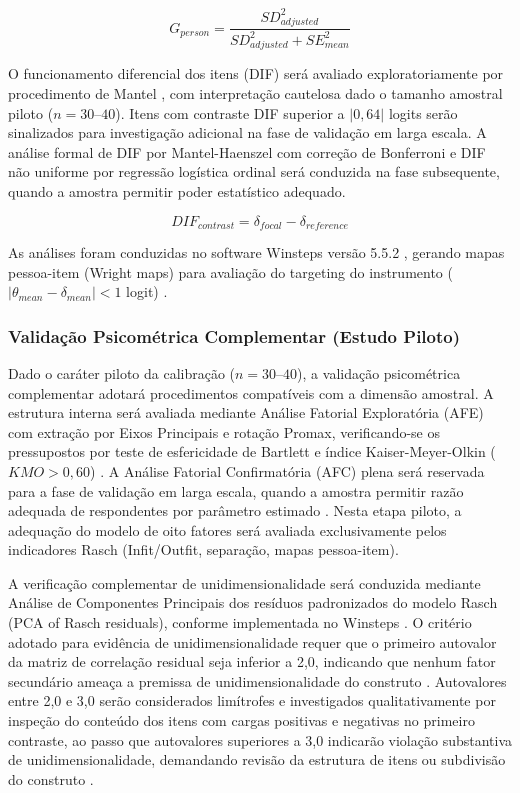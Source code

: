 \documentclass[pdflatex,sn-basic]{sn-jnl}%
\theoremstyle{thmstyleone}%
\theoremstyle{thmstyletwo}%
\theoremstyle{thmstylethree}%
\begin{document}
\begin{equation}
G_{person} = \frac{SD_{adjusted}^2}{SD_{adjusted}^2 + SE_{mean}^2}
\label{eq:gsep}
\end{equation}

O funcionamento diferencial dos itens (DIF) será avaliado exploratoriamente por procedimento de Mantel \citep{Bond2020ApplyingSciences}, com interpretação cautelosa dado o tamanho amostral piloto ($n = 30$--$40$). Itens com contraste DIF superior a $|0{,}64|$ logits serão sinalizados para investigação adicional na fase de validação em larga escala. A análise formal de DIF por Mantel-Haenszel com correção de Bonferroni e DIF não uniforme por regressão logística ordinal será conduzida na fase subsequente, quando a amostra permitir poder estatístico adequado.

\begin{equation}
DIF_{contrast} = \delta_{focal} - \delta_{reference}
\label{eq:dif}
\end{equation}

As análises foram conduzidas no software Winsteps versão 5.5.2 \citep{Linacre2023}, gerando mapas pessoa-item (Wright maps) para avaliação do targeting do instrumento ($|\theta_{mean} - \delta_{mean}| < 1$ logit) \citep{Bond2020}.


\subsubsection{Validação Psicométrica Complementar (Estudo Piloto)}\label{subsubsec:validacao_psicometrica}

Dado o caráter piloto da calibração ($n = 30$--$40$), a validação psicométrica complementar adotará procedimentos compatíveis com a dimensão amostral. A estrutura interna será avaliada mediante Análise Fatorial Exploratória (AFE) \cite{Fabrigar1999} com extração por Eixos Principais e rotação Promax, verificando-se os pressupostos por teste de esfericidade de Bartlett e índice Kaiser-Meyer-Olkin ($KMO > 0{,}60$) \cite{Kaiser1974}. A Análise Fatorial Confirmatória (AFC) plena será reservada para a fase de validação em larga escala, quando a amostra permitir razão adequada de respondentes por parâmetro estimado \cite{Brown2015}. Nesta etapa piloto, a adequação do modelo de oito fatores será avaliada exclusivamente pelos indicadores Rasch (Infit/Outfit, separação, mapas pessoa-item).

A verificação complementar de unidimensionalidade será conduzida mediante Análise de Componentes Principais dos resíduos padronizados do modelo Rasch (PCA of Rasch residuals), conforme implementada no Winsteps \cite{Linacre2023}. O critério adotado para evidência de unidimensionalidade requer que o primeiro autovalor da matriz de correlação residual seja inferior a 2,0, indicando que nenhum fator secundário ameaça a premissa de unidimensionalidade do construto \cite{Smith2002,Linacre2023}. Autovalores entre 2,0 e 3,0 serão considerados limítrofes e investigados qualitativamente por inspeção do conteúdo dos itens com cargas positivas e negativas no primeiro contraste, ao passo que autovalores superiores a 3,0 indicarão violação substantiva de unidimensionalidade, demandando revisão da estrutura de itens ou subdivisão do construto \cite{Bond2020}.
\end{document}
